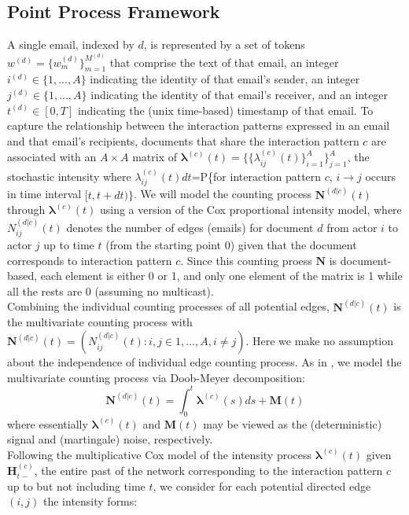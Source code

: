 \documentclass[a4paper]{article}
\begin{document}
\subsection{Point Process Framework}
A single email, indexed by $d$, is represented by a set of tokens $w^{(d)} = \{w^{(d)}_m \}_{m=1}^{M^{(d)}}$ that comprise the
text of that email, an integer $i^{(d)} \in \{1,...,A\}$ indicating the identity of that email’s sender, an integer $j^{(d)} \in \{1,...,A\}$ indicating the identity of that email’s receiver, and an integer $t^{(d)} \in [0, T]$ indicating the (unix time-based) timestamp of that email. To capture the relationship between the interaction patterns expressed in an email and that email’s recipients, documents that share the interaction pattern $c$ are associated with an $A\times A$ matrix of $\boldsymbol{\lambda}^{(c)}(t)=\{\{\lambda^{(c)}_{ij}(t)\}_{i=1}^{A}\}_{j=1}^{A}$, the stochastic intensity where $\lambda^{(c)}_{ij}(t)dt$=P\{for interaction pattern $c$, $i\rightarrow j$ occurs in time interval $[t, t+dt)\}$. We will model the counting process $\mathbf{N}^{(d|c)}(t)$ through $\boldsymbol{\lambda}^{(c)}(t)$ using a version of the Cox proportional intensity model, where $N_{ij}^{(d|c)}(t)$ denotes the number of edges (emails) for document $d$ from actor $i$ to actor $j$ up to time $t$ (from the starting point 0) given that the document corresponds to interaction pattern $c$. Since this counting proess $\mathbf{N}$ is document-based, each element is either 0 or 1, and only one element of the matrix is 1 while all the rests are 0 (assuming no multicast). \\ \newline Combining the individual counting processes of all potential edges,  $\mathbf{N}^{(d|c)}(t)$ is the multivariate counting process with $\mathbf{N}^{(d|c)}(t)=(N^{(d|c)}_{ij}(t): i, j \in {1, ..., A}, i \neq j)$. Here we make no assumption about the independence of individual edge counting process. As in \cite{Vu2011}, we model the multivariate counting process via Doob-Meyer decomposition:
\begin{equation}
\mathbf{N}^{(d|c)}(t)=\int_0^t\boldsymbol{\lambda}^{(c)}(s)ds + \mathbf{M}(t)
\end{equation}
where essentially $\boldsymbol{\lambda}^{(c)}(t)$ and $\mathbf{M}(t)$ may be viewed as the (deterministic) signal and (martingale) noise, respectively.\\ \newline
Following the multiplicative Cox model of the intensity process $\boldsymbol{\lambda}^{(c)}(t)$ given $\boldsymbol{H}^{(c)}_{t-}$, the entire past of the network corresponding to the interaction pattern $c$ up to but not including time $t$, we consider for each potential directed edge $(i, j)$ the intensity forms:
\end{document}
